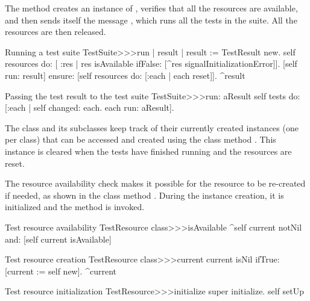 \documentclass[a4paper,10pt,twoside]{book}
\begin{document}
The method  creates an instance of
, verifies that all the resources are available, and then sends itself
the message , which runs all
the tests in the suite.  All the resources are then
released.
\begin{method}[testsuiterun]{Running a test suite}
TestSuite>>>run
	| result |
 	result := TestResult new.
	self resources do: [ :res |
		res isAvailable ifFalse: [^res signalInitializationError]].
	[self run: result] ensure: [self resources do: [:each | each reset]].
	^result
\end{method}

\begin{method}[testsuiterun:]{Passing the test result to the test suite}
TestSuite>>>run: aResult
	self tests do: [:each | 
		self changed: each.
		each run: aResult].
\end{method}
The class  and its subclasses keep track of
their currently created instances (one per class) that can be accessed
and created using the class method .  This instance is
cleared when the tests have finished running and the resources are
reset.

The resource availability check makes it possible for the resource to be 
re-created if needed, as shown in the class method .  During the 
instance creation, it is initialized and the method  is
invoked.


\begin{method}[testresourceisavailable]{Test resource availability}
TestResource class>>>isAvailable
	^self current notNil and: [self current isAvailable]
\end{method}
\begin{method}[testresourcecurrent]{Test resource creation}
TestResource class>>>current
	current isNil ifTrue: [current := self new].
	^current
\end{method}
\begin{method}[restresourceinitialize]{Test resource initialization}
TestResource>>>initialize
	super initialize.
	self setUp
\end{method}
\end{document}
